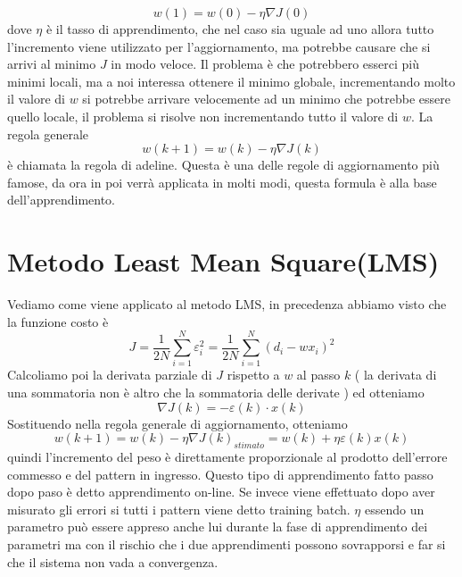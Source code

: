 \begin{equation}
w(1) = w(0) - \eta \nabla J(0)
\end{equation}
dove $\eta$ è il tasso di apprendimento, che nel caso sia uguale ad uno allora tutto l'incremento viene utilizzato per l'aggiornamento, ma potrebbe causare che si arrivi al minimo $J$ in modo veloce. Il problema è che potrebbero esserci più minimi locali, ma a noi interessa ottenere il minimo globale, incrementando molto il valore di $w$ si potrebbe arrivare velocemente ad un minimo che potrebbe essere quello locale, il problema si risolve non incrementando tutto il valore di $w$. La regola generale 
\begin{equation}
w(k+1) = w(k) - \eta \nabla J(k)
\end{equation}
è chiamata la regola di adeline. Questa è una delle regole di aggiornamento più famose, da ora in poi verrà applicata in molti modi, questa formula è alla base dell'apprendimento. 

\section{Metodo Least Mean Square(LMS)}
Vediamo come viene applicato al metodo LMS, in precedenza abbiamo visto che la funzione costo è 
\begin{equation}
J = \frac{1}{2N} \sum_{i=1}^N \varepsilon_i^2 = \frac{1}{2N} \sum_{i=1}^N (d_i - wx_i)^2
\end{equation}
Calcoliamo poi la derivata parziale di $J$ rispetto a $w$ al passo $k$  ( la derivata di una sommatoria non è altro che la sommatoria delle derivate ) ed otteniamo
\begin{equation}
\nabla J(k) = - \varepsilon (k) \cdot x(k)
\end{equation}
Sostituendo nella regola generale di aggiornamento, otteniamo 
\begin{equation}
w(k+1) = w(k)- \eta \nabla J (k)_{stimato} = w(k) + \eta \varepsilon(k)x(k)
\end{equation}
quindi l'incremento del peso è direttamente proporzionale al prodotto dell'errore commesso e del pattern in ingresso. Questo tipo di apprendimento fatto passo dopo paso è detto apprendimento on-line. Se invece viene effettuato dopo aver misurato gli errori si tutti i pattern viene detto training batch. $\eta$ essendo un parametro può essere appreso anche lui durante la fase di apprendimento dei parametri ma con il rischio che i due apprendimenti possono sovrapporsi e far si che il sistema non vada a convergenza.

